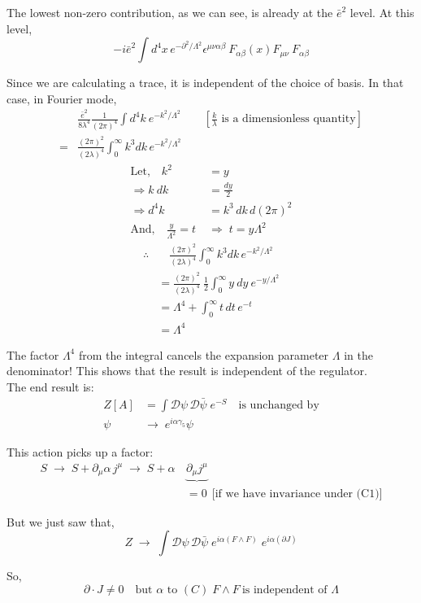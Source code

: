 \documentclass[14pt]{article} %
\begin{document}
The lowest non-zero contribution, as we can see, is already at the $\bar e^2$ level. At this level,
\[
-i \bar e^2 \int d^4x \,
e^{-\partial^2/\Lambda^2}
\epsilon^{\mu\nu\alpha\beta} \ 
F_{\alpha \beta}(x)
F_{\mu\nu} \ F_{\alpha\beta}
\]

Since we are calculating a trace, it is independent of the choice of basis. In that case, in Fourier mode,
\begin{align*}
& \frac{\bar e^2}{8\lambda^4} \frac{1}{(2\pi)^4}
\int d^4k ~ e^{-k^2/\Lambda^2} \qquad\left[ \frac{k}{\lambda} \text{ is a dimensionless quantity} \right]
\\
=
& \frac{{(2\pi)}^2}{(2\lambda)^4}
\int_0^\infty k^3 dk \, e^{-k^2/\Lambda^2}
\end{align*}
\begin{align*}
\text{Let,}\quad k^2 &= y
\\
\Rightarrow k\ dk &= \frac{dy}{2}
\\
\Rightarrow d^4k &= k^3\,dk\, d(2\pi)^2
\\
\text{And,} \quad\frac{y}{\Lambda^2} = t \;&\Rightarrow\; t = y\Lambda^2
\end{align*}
\begin{align*}
\therefore &\quad
\frac{{(2\pi)}^2}{(2\lambda)^4}
\int_0^\infty k^3 dk \, e^{-k^2/\Lambda^2} 
\\
&= \frac{{(2\pi)}^2}{(2\lambda)^4}
~ \frac12 \int_0^\infty y \ dy \ e^{-y/\Lambda^2}
\\
&= \Lambda^4 + \int_0^\infty t\,dt\, e^{-t}
\\
&= \Lambda^4
\end{align*}

The factor $\Lambda^4$ from the integral cancels the expansion parameter $\Lambda$ in the denominator! This shows that the result is independent of the regulator.\\

The end result is:
\begin{align*}
Z[A] &= \int \mathcal{D}\psi \, \mathcal{D}\bar\psi \; e^{-S}
\quad \text{is unchanged by}
\\
\psi \;&\to\; e^{i\alpha\gamma_5}\psi \tag{C1}\label{C1}
\end{align*}

This action picks up a factor:
\begin{align*}
S \;\to\; S + \partial_\mu \alpha\, j^\mu
\;\to\;
S + \alpha\, &\underbrace{\partial_\mu j^\mu}
\\
& =0 ~~\text{[if we have invariance under (C1)]}
\end{align*}

But we just saw that,
\[
Z \;\to\;
\int \mathcal{D}\psi \, \mathcal{D}\bar\psi \;
e^{i\alpha(F\wedge F)}
\;
e^{i\alpha(\partial J)}
\]

So,
\[
\partial \cdot J \neq 0
\quad \text{but } \alpha \text{ to } (C)\; F\wedge F ~\text{is independent of } \Lambda
\]

\end{document}
